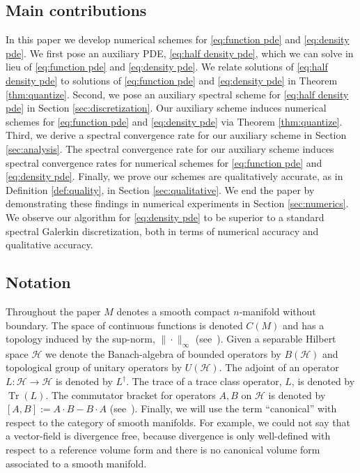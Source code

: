 \documentclass[final,leqno]{siamart}
\DeclareMathOperator{\Tr}{Tr}
\begin{document}
\subsection{Main contributions}

In this paper we develop numerical schemes for \eqref{eq:function pde} and \eqref{eq:density pde}.
We first pose an auxiliary PDE, \eqref{eq:half density pde}, which we can solve in lieu of \eqref{eq:function pde} and \eqref{eq:density pde}.
We relate solutions of \eqref{eq:half density pde} to solutions of \eqref{eq:function pde} and \eqref{eq:density pde} in Theorem \ref{thm:quantize}.
Second, we pose an auxiliary spectral scheme for \eqref{eq:half density pde} in Section \ref{sec:discretization}.
Our auxiliary scheme induces numerical schemes for \eqref{eq:function pde} and \eqref{eq:density pde} via Theorem \ref{thm:quantize}.
Third, we derive a spectral convergence rate for our auxiliary scheme in Section \ref{sec:analysis}.
The spectral convergence rate for our auxiliary scheme induces spectral convergence rates for numerical schemes for \eqref{eq:function pde} and \eqref{eq:density pde}.
Finally, we prove our schemes are qualitatively accurate, as in Definition \ref{def:quality}, in Section \ref{sec:qualitative}.
We end the paper by demonstrating these findings in numerical experiments in Section \ref{sec:numerics}.
We observe our algorithm for \eqref{eq:density pde} to be superior to a standard spectral Galerkin discretization, both in terms of numerical accuracy and qualitative accuracy.


\subsection{Notation}
Throughout the paper $M$ denotes a smooth compact $n$-manifold without boundary. 
The space of continuous functions is denoted $C(M)$ and has a topology induced by the sup-norm, $\| \cdot \|_{\infty}$ (see~\cite{Taylor1974,Conway1990}).
Given a separable Hilbert space $\mathcal{H}$ we denote the Banach-algebra of bounded operators by $B( \mathcal{H})$ and topological group of unitary operators by $U( \mathcal{H})$.
The adjoint of an operator $L : \mathcal{H} \to \mathcal{H}$ is denoted by $L^{\dagger}$.
The trace of a trace class operator, $L$, is denoted by $\Tr(L)$.
The commutator bracket for operators $A,B$ on $\mathcal{H}$ is denoted by $[A,B] := A \cdot B - B \cdot A$ (see~\cite{Conway1990}).
Finally, we will use the term ``canonical''  with respect to the category of smooth manifolds.
For example, we could not say that a vector-field is divergence free, because divergence is only well-defined with respect to a reference volume form and there is no canonical volume form associated to a smooth manifold.
\end{document}
